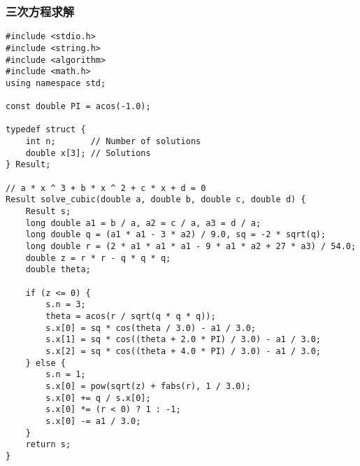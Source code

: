 \subsubsection{三次方程求解}
\begin{verbatim}
#include <stdio.h>
#include <string.h>
#include <algorithm>
#include <math.h>
using namespace std;

const double PI = acos(-1.0);

typedef struct {
    int n;       // Number of solutions
    double x[3]; // Solutions
} Result;

// a * x ^ 3 + b * x ^ 2 + c * x + d = 0
Result solve_cubic(double a, double b, double c, double d) {
    Result s;
    long double a1 = b / a, a2 = c / a, a3 = d / a;
    long double q = (a1 * a1 - 3 * a2) / 9.0, sq = -2 * sqrt(q);
    long double r = (2 * a1 * a1 * a1 - 9 * a1 * a2 + 27 * a3) / 54.0;
    double z = r * r - q * q * q;
    double theta;

    if (z <= 0) {
        s.n = 3;
        theta = acos(r / sqrt(q * q * q));
        s.x[0] = sq * cos(theta / 3.0) - a1 / 3.0;
        s.x[1] = sq * cos((theta + 2.0 * PI) / 3.0) - a1 / 3.0;
        s.x[2] = sq * cos((theta + 4.0 * PI) / 3.0) - a1 / 3.0;
    } else {
        s.n = 1;
        s.x[0] = pow(sqrt(z) + fabs(r), 1 / 3.0);
        s.x[0] += q / s.x[0];
        s.x[0] *= (r < 0) ? 1 : -1;
        s.x[0] -= a1 / 3.0;
    }
    return s;
}
\end{verbatim}
